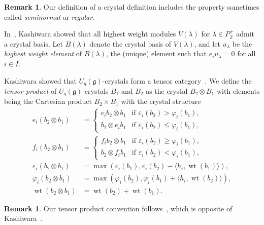 \documentclass[11pt, leqno]{amsart}
\theoremstyle{plain}
\theoremstyle{definition}
\newtheorem{remark}[theorem]{Remark}
\numberwithin{equation}{section}
\newcommand{\g}{\mathfrak{g}}
\newcommand{\Z}{\mathbb{Z}}
\newcommand{\wt}{\operatorname{wt}} %
\newcommand{\defn}[1]{{\color{darkred}\emph{#1}}} %
\begin{document}
\begin{remark}
Our definition of a crystal definition includes the property sometimes called \defn{seminormal} or \defn{regular}.
\end{remark}

In~\cite{K90}, Kashiwara showed that all highest weight modules $V(\lambda)$ for $\lambda \in P_{\Z}^+$ admit a crystal basis. Let $B(\lambda)$ denote the crystal basis of $V(\lambda)$, and let $u_{\lambda}$ be the \defn{highest weight element} of $B(\lambda)$, the (unique) element such that $e_i u_{\lambda} = 0$ for all $i \in I$.

Kashiwara showed that $U_q(\g)$-crystals form a tensor category~\cite{K91}. We define the \defn{tensor product} of $U_q(\g)$-crystals $B_1$ and $B_2$ as the crystal $B_2 \otimes B_1$ with elements being the Cartesian product $B_2 \times B_1$ with the crystal structure
\begin{align*}
e_i(b_2 \otimes b_1) & = \begin{cases}
e_i b_2 \otimes b_1 & \text{if } \varepsilon_i(b_2) > \varphi_i(b_1), \\
b_2 \otimes e_i b_1 & \text{if } \varepsilon_i(b_2) \leq \varphi_i(b_1),
\end{cases}
\\ f_i(b_2 \otimes b_1) & = \begin{cases}
f_i b_2 \otimes b_1 & \text{if } \varepsilon_i(b_2) \geq \varphi_i(b_1), \\
b_2 \otimes f_i b_1 & \text{if } \varepsilon_i(b_2) < \varphi_i(b_1),
\end{cases}
\\ \varepsilon_i(b_2 \otimes b_1) & = \max(\varepsilon_i(b_1), \varepsilon_i(b_2) - \langle h_i, \wt(b_1) \rangle),
\\ \varphi_i(b_2 \otimes b_1) & = \max(\varphi_i(b_2), \varphi_i(b_1) + \langle h_i, \wt(b_2) \rangle),
\\ \wt(b_2 \otimes b_1) & = \wt(b_2) + \wt(b_1).
\end{align*}

\begin{remark}
Our tensor product convention follows~\cite{BS17}, which is opposite of Kashiwara~\cite{K91}.
\end{remark}
\end{document}
